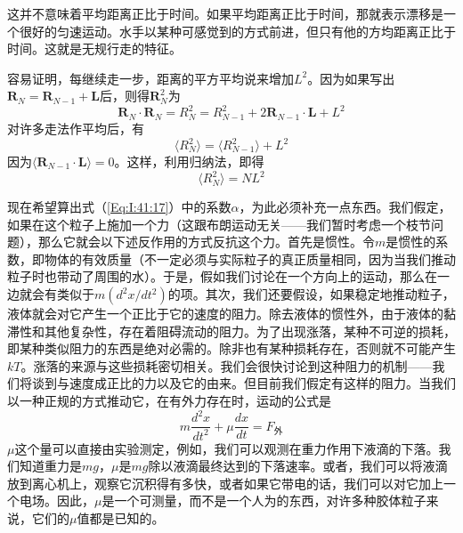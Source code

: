 这并不意味着平均距离正比于时间。如果平均距离正比于时间，那就表示漂移是一个很好的匀速运动。水手以某种可感觉到的方式前进，但只有他的方均距离正比于时间。这就是无规行走的特征。

容易证明，每继续走一步，距离的平方平均说来增加$L^2$。因为如果写出$\boldsymbol{R}_N=\boldsymbol{R}_{N-1}+\boldsymbol{L}$后，则得$\boldsymbol{R}^2_N$为
\begin{equation*}
    \boldsymbol{R}_N \cdot \boldsymbol{R}_N = R_N^2 = R_{N-1}^2 + 2\boldsymbol{R}_{N-1} \cdot \boldsymbol{L} + L^2
\end{equation*}
对许多走法作平均后，有
\begin{equation*}
    \langle R_N^2 \rangle = \langle R_{N-1}^2 \rangle + L^2
\end{equation*}
因为$\langle \boldsymbol{R}_{N-1}\cdot\boldsymbol{L} \rangle = 0$。这样，利用归纳法，即得
\begin{equation}
    \label{Eq:I:41:18}
    \langle R_N^2 \rangle = NL^2
\end{equation}

现在希望算出式（\ref{Eq:I:41:17}）中的系数$\alpha$，为此必须补充一点东西。我们假定，如果在这个粒子上施加一个力（这跟布朗运动无关——我们暂时考虑一个枝节问题），那么它就会以下述反作用的方式反抗这个力。首先是惯性。令$m$是惯性的系数，即物体的有效质量（不一定必须与实际粒子的真正质量相同，因为当我们推动粒子时也带动了周围的水）。于是，假如我们讨论在一个方向上的运动，那么在一边就会有类似于$m(d^2x/dt^2)$的项。其次，我们还要假设，如果稳定地推动粒子，液体就会对它产生一个正比于它的速度的阻力。除去液体的惯性外，由于液体的黏滞性和其他复杂性，存在着阻碍流动的阻力。为了出现涨落，某种不可逆的损耗，即某种类似阻力的东西是绝对必需的。除非也有某种损耗存在，否则就不可能产生$kT$。涨落的来源与这些损耗密切相关。我们会很快讨论到这种阻力的机制——我们将谈到与速度成正比的力以及它的由来。但目前我们假定有这样的阻力。当我们以一种正规的方式推动它，在有外力存在时，运动的公式是
\begin{equation}
    \label{Eq:I:41:19}
    m\frac{d^2x}{dt^2} + \mu\frac{dx}{dt} = F_\text{外}
\end{equation}
$\mu$这个量可以直接由实验测定，例如，我们可以观测在重力作用下液滴的下落。我们知道重力是$mg$，$\mu$是$mg$除以液滴最终达到的下落速率。或者，我们可以将液滴放到离心机上，观察它沉积得有多快，或者如果它带电的话，我们可以对它加上一个电场。因此，$\mu$是一个可测量，而不是一个人为的东西，对许多种胶体粒子来说，它们的$\mu$值都是已知的。

